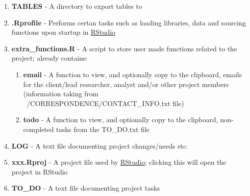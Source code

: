 \documentclass{article}\usepackage{graphicx, color}
\begin{document}
\begin{enumerate}
  \item \textbf{TABLES} - A directory to export tables to 
  \item \textbf{.Rprofile} - Performs certan tasks such as loading libraries, 
      data and sourcing functions upon startup in \href{http://www.rstudio.com/}{RStudio}
  \item \textbf{extra\_functions.R} - A script to store user made functions related to the project; already contains:
  \begin{enumerate}
     \item \textbf{email} - A function to view, and optionally copy to the clipboard, emails for the client/lead researcher, analyst and/or other project members (information taking from ~/CORRESPONDENCE/CONTACT\_INFO.txt file)
     \item \textbf{todo} - A function to view, and optionally copy to the clipboard, non-completed tasks from the TO\_DO.txt file
  \end{enumerate}   
  \item \textbf{LOG} - A text file documenting project changes/needs etc.
  \item \textbf{xxx.Rproj} - A project file used by \href{http://www.rstudio.com/}{RStudio}; clicking this will open the project in RStudio
  \item \textbf{TO\_DO} - A text file documenting project tasks 
\end{enumerate}
\end{document}
